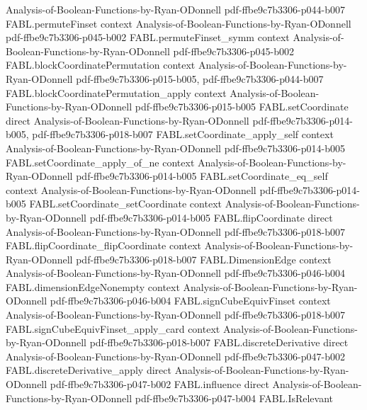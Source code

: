 \begin{theorem}
  {Analysis-of-Boolean-Functions-by-Ryan-ODonnell}
  {pdf-ffbe9c7b3306-p044-b007}
\proofstep
  {FABL.permuteFinset}
  {context}
  {Analysis-of-Boolean-Functions-by-Ryan-ODonnell}
  {pdf-ffbe9c7b3306-p045-b002}
\proofstep
  {FABL.permuteFinset_symm}
  {context}
  {Analysis-of-Boolean-Functions-by-Ryan-ODonnell}
  {pdf-ffbe9c7b3306-p045-b002}
\proofstep
  {FABL.blockCoordinatePermutation}
  {context}
  {Analysis-of-Boolean-Functions-by-Ryan-ODonnell}
  {pdf-ffbe9c7b3306-p015-b005,
    pdf-ffbe9c7b3306-p044-b007}
\proofstep
  {FABL.blockCoordinatePermutation_apply}
  {context}
  {Analysis-of-Boolean-Functions-by-Ryan-ODonnell}
  {pdf-ffbe9c7b3306-p015-b005}
\proofstep
  {FABL.setCoordinate}
  {direct}
  {Analysis-of-Boolean-Functions-by-Ryan-ODonnell}
  {pdf-ffbe9c7b3306-p014-b005,
    pdf-ffbe9c7b3306-p018-b007}
\proofstep
  {FABL.setCoordinate_apply_self}
  {context}
  {Analysis-of-Boolean-Functions-by-Ryan-ODonnell}
  {pdf-ffbe9c7b3306-p014-b005}
\proofstep
  {FABL.setCoordinate_apply_of_ne}
  {context}
  {Analysis-of-Boolean-Functions-by-Ryan-ODonnell}
  {pdf-ffbe9c7b3306-p014-b005}
\proofstep
  {FABL.setCoordinate_eq_self}
  {context}
  {Analysis-of-Boolean-Functions-by-Ryan-ODonnell}
  {pdf-ffbe9c7b3306-p014-b005}
\proofstep
  {FABL.setCoordinate_setCoordinate}
  {context}
  {Analysis-of-Boolean-Functions-by-Ryan-ODonnell}
  {pdf-ffbe9c7b3306-p014-b005}
\proofstep
  {FABL.flipCoordinate}
  {direct}
  {Analysis-of-Boolean-Functions-by-Ryan-ODonnell}
  {pdf-ffbe9c7b3306-p018-b007}
\proofstep
  {FABL.flipCoordinate_flipCoordinate}
  {context}
  {Analysis-of-Boolean-Functions-by-Ryan-ODonnell}
  {pdf-ffbe9c7b3306-p018-b007}
\proofstep
  {FABL.DimensionEdge}
  {context}
  {Analysis-of-Boolean-Functions-by-Ryan-ODonnell}
  {pdf-ffbe9c7b3306-p046-b004}
\proofstep
  {FABL.dimensionEdgeNonempty}
  {context}
  {Analysis-of-Boolean-Functions-by-Ryan-ODonnell}
  {pdf-ffbe9c7b3306-p046-b004}
\proofstep
  {FABL.signCubeEquivFinset}
  {context}
  {Analysis-of-Boolean-Functions-by-Ryan-ODonnell}
  {pdf-ffbe9c7b3306-p018-b007}
\proofstep
  {FABL.signCubeEquivFinset_apply_card}
  {context}
  {Analysis-of-Boolean-Functions-by-Ryan-ODonnell}
  {pdf-ffbe9c7b3306-p018-b007}
\proofstep
  {FABL.discreteDerivative}
  {direct}
  {Analysis-of-Boolean-Functions-by-Ryan-ODonnell}
  {pdf-ffbe9c7b3306-p047-b002}
\proofstep
  {FABL.discreteDerivative_apply}
  {direct}
  {Analysis-of-Boolean-Functions-by-Ryan-ODonnell}
  {pdf-ffbe9c7b3306-p047-b002}
\proofstep
  {FABL.influence}
  {direct}
  {Analysis-of-Boolean-Functions-by-Ryan-ODonnell}
  {pdf-ffbe9c7b3306-p047-b004}
\proofstep
  {FABL.IsRelevant}

\end{theorem}
